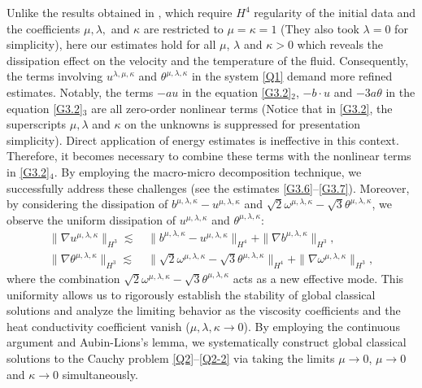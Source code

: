 \documentclass[reqno,11pt]{amsart}
\theoremstyle{plain}
\numberwithin{equation}{section}
\begin{document}
 Unlike the results obtained in \cite{Mu-Wang-20}, which require $H^4$ regularity of the initial 
 data and 
 the coefficients $\mu, \lambda, $ and $  \kappa$ are restricted to $\mu=\kappa = 1$ (They also
  took $\lambda=0$ for simplicity), here  our estimates hold for all 
$\mu$, $\lambda$ and $\kappa > 0$ which reveals the dissipation effect on the velocity and the temperature of the
 fluid.  
Consequently, the terms involving $u^{\lambda,\mu,\kappa}$ 
and $\theta^{\mu,\lambda,\kappa}$ in the system \eqref{Q1} demand more refined estimates. Notably, 
the terms $-a u$ in the  equation \eqref{G3.2}$_2$, $-b \cdot u$ and $-3a\theta$ in the 
equation \eqref{G3.2}$_3$ are all zero-order nonlinear terms (Notice that in \eqref{G3.2}, 
the superscripts $\mu,\lambda$ and $\kappa$ on the unknowns is suppressed for presentation simplicity). 
Direct application of energy estimates is ineffective in this context. 
Therefore, it becomes necessary to combine these terms with the nonlinear terms in \eqref{G3.2}$_4$.
 By employing the macro-micro decomposition technique, we successfully address these challenges 
 (see the estimates \eqref{G3.6}--\eqref{G3.7}). Moreover, by considering the dissipation of
  $b^{\mu,\lambda,\kappa}-u^{\mu,\lambda,\kappa}$ and $\sqrt{2}\omega^{\mu,\lambda,\kappa} 
  - \sqrt{3}\theta^{\mu,\lambda,\kappa}$, 
we observe the uniform dissipation of $u^{\mu,\lambda,\kappa}$ and $\theta^{\mu,\lambda,\kappa}$:  
\begin{align*}  
\|\nabla u^{\mu,\lambda,\kappa}\|_{H^3} \lesssim&\, \| b^{\mu,\lambda,\kappa} 
- u^{\mu,\lambda,\kappa} \|_{H^4} + \|\nabla b^{\mu,\lambda,\kappa}\|_{H^3},\\
\|\nabla \theta^{\mu,\lambda,\kappa}\|_{H^3} \lesssim &\,\| \sqrt{2}\omega^{\mu,\lambda,\kappa} 
- \sqrt{3}\theta^{\mu,\lambda,\kappa} \|_{H^4} + \|\nabla\omega^{\mu,\lambda,\kappa}\|_{H^3}, 
\end{align*}  
where the combination $\sqrt{2}\omega^{\mu,\lambda,\kappa} 
- 
\sqrt{3}\theta^{\mu,\lambda,\kappa}$ acts as a new effective mode.  
This uniformity allows us to rigorously establish the stability of
 global classical solutions and analyze the limiting behavior as the viscosity coefficients and 
the heat conductivity coefficient vanish ($\mu,\lambda,\kappa \to 0$).  
By employing the continuous argument and  Aubin-Lions's lemma, we systematically 
construct global classical solutions to the Cauchy problem \eqref{Q2}--\eqref{Q2-2} via 
taking the  limits $\mu\rightarrow0$, $\mu\rightarrow0$ and  $\kappa \rightarrow  0$ simultaneously.
\end{document}
